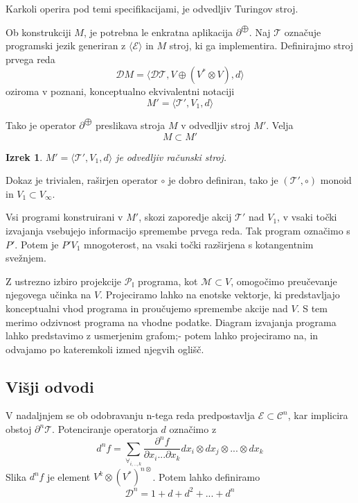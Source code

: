 \documentclass{article}
\newcommand{\II}{\mathbb{I}}
\newcommand{\E}{\mathcal{E}}
\newcommand{\T}{\mathcal{T}}
\newcommand{\D}{\mathcal{D}}
\newcommand{\Op}{\partial^{\bigoplus}}
\newcommand{\op}[1]{\partial^{#1\bigoplus}}
\newtheorem{izrek}{Izrek}[section]
\begin{document}
 Karkoli operira pod temi specifikacijami, je odvedljiv Turingov stroj.
 
 Ob konstrukciji $M$, je potrebna le enkratna aplikacija $\Op$. Naj $\T$ označuje programski jezik generiran z $\langle\E\rangle$ in $M$ stroj, ki ga implementira. Definirajmo stroj prvega reda
 \begin{equation}\label{eq:Mprime}
	 \D M=\langle\D\T, V\oplus (V^*\otimes V), d\rangle
 \end{equation}
 oziroma v poznani, konceptualno ekvivalentni notaciji
  \begin{equation}\label{eq:M'}
 	 M'=\langle\T', V_1, d\rangle
  \end{equation}
  
  Tako je operator $\op{}$ preslikava stroja $M$ v odvedljiv stroj $M'$. Velja 
  \begin{equation*}
	M\subset M'
  \end{equation*} 
  
  \begin{izrek}\label{izr:dM}
	$M'=\langle\T', V_1, d\rangle$ je odvedljiv računski stroj.
  \end{izrek}
  Dokaz je trivialen, raširjen operator $\circ$ je dobro definiran, tako je $(\T', \circ)$ monoid in $V_1\subset V_\infty$.
  
  Vsi programi konstruirani v $M'$, skozi zaporedje akcij $\T'$ nad $V_1$, v vsaki točki izvajanja vsebujejo informacijo spremembe prvega reda. Tak program označimo s $P'$. Potem je $P'V_1$ mnogoterost, na vsaki točki razširjena s kotangentnim svežnjem.
 
 Z ustrezno izbiro projekcije $\mathcal{P}_\II$ programa, kot $\mathcal{M}\subset V$, omogočimo preučevanje njegovega učinka na $V$. Projeciramo lahko na enotske vektorje, ki predstavljajo konceptualni vhod programa in proučujemo spremembe akcije nad $V$. S tem merimo odzivnost programa na vhodne podatke. Diagram izvajanja programa lahko predstavimo z usmerjenim grafom;- potem lahko projeciramo na, in odvajamo po kateremkoli izmed njegvih oglišč.
  
 \subsection{Višji odvodi}
 
 V nadaljnjem se ob odobravanju n-tega reda predpostavlja $\E\subset\mathcal{C}^n$, kar implicira obstoj $\partial^n\T$. Potenciranje operatorja $d$ označimo z
\begin{equation}\label{eq:d}
d^nf=\sum_{\forall_{i,..,k}}\frac{\partial^n f}{\partial x_i...\partial x_k}dx_i\otimes dx_j\otimes...\otimes dx_k
\end{equation}
Slika $d^nf$ je element $V^k\otimes(V^*)^{n\otimes}$.
Potem lahko definiramo
\begin{equation}\label{eq:op}
\D^n=1+ d+ d^2+...+ d^n
\end{equation}
\end{document}
